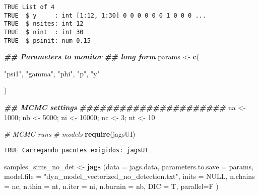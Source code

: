 \documentclass[
]{article}
\newenvironment{Shaded}{\begin{snugshade}}{\end{snugshade}}
\newcommand{\AttributeTok}[1]{\textcolor[rgb]{0.13,0.29,0.53}{#1}}
\newcommand{\CommentTok}[1]{\textcolor[rgb]{0.56,0.35,0.01}{\textit{#1}}}
\newcommand{\ConstantTok}[1]{\textcolor[rgb]{0.56,0.35,0.01}{#1}}
\newcommand{\DecValTok}[1]{\textcolor[rgb]{0.00,0.00,0.81}{#1}}
\newcommand{\DocumentationTok}[1]{\textcolor[rgb]{0.56,0.35,0.01}{\textbf{\textit{#1}}}}
\newcommand{\FunctionTok}[1]{\textcolor[rgb]{0.13,0.29,0.53}{\textbf{#1}}}
\newcommand{\NormalTok}[1]{#1}
\newcommand{\OtherTok}[1]{\textcolor[rgb]{0.56,0.35,0.01}{#1}}
\newcommand{\StringTok}[1]{\textcolor[rgb]{0.31,0.60,0.02}{#1}}
\begin{document}
\begin{verbatim}
TRUE List of 4
TRUE  $ y     : int [1:12, 1:30] 0 0 0 0 0 0 1 0 0 0 ...
TRUE  $ nsites: int 12
TRUE  $ nint  : int 30
TRUE  $ psinit: num 0.15
\end{verbatim}

\begin{Shaded}
\begin{Highlighting}[]
\DocumentationTok{\#\# Parameters to monitor}
\DocumentationTok{\#\# long form}
\NormalTok{params }\OtherTok{\textless{}{-}} \FunctionTok{c}\NormalTok{(}
  
  \StringTok{"psi1"}\NormalTok{,}
  \StringTok{"gamma"}\NormalTok{, }
  \StringTok{"phi"}\NormalTok{,}
  \StringTok{"p"}\NormalTok{,}
  \StringTok{"y"}
  
\NormalTok{)}

\DocumentationTok{\#\# MCMC settings}
\DocumentationTok{\#\#\#\#\#\#\#\#\#\#\#\#\#\#\#\#\#\#\#\#\#\#}
\NormalTok{na }\OtherTok{\textless{}{-}} \DecValTok{1000}\NormalTok{; nb }\OtherTok{\textless{}{-}} \DecValTok{5000}\NormalTok{; ni }\OtherTok{\textless{}{-}} \DecValTok{10000}\NormalTok{; nc }\OtherTok{\textless{}{-}} \DecValTok{3}\NormalTok{; nt }\OtherTok{\textless{}{-}} \DecValTok{10}

\CommentTok{\# MCMC runs}
\CommentTok{\# models}
\FunctionTok{require}\NormalTok{(jagsUI)}
\end{Highlighting}
\end{Shaded}

\begin{verbatim}
TRUE Carregando pacotes exigidos: jagsUI
\end{verbatim}

\begin{Shaded}
\begin{Highlighting}[]
\NormalTok{samples\_sims\_no\_det }\OtherTok{\textless{}{-}} \FunctionTok{jags}\NormalTok{ (}\AttributeTok{data =}\NormalTok{ jags.data, }
                             \AttributeTok{parameters.to.save =}\NormalTok{ params, }
                             \AttributeTok{model.file =} \StringTok{"dyn\_model\_vectorized\_no\_detection.txt"}\NormalTok{, }
                             \AttributeTok{inits =} \ConstantTok{NULL}\NormalTok{, }
                             \AttributeTok{n.chains =}\NormalTok{ nc, }
                             \AttributeTok{n.thin =}\NormalTok{ nt, }
                             \AttributeTok{n.iter =}\NormalTok{ ni, }
                             \AttributeTok{n.burnin =}\NormalTok{ nb, }
                             \AttributeTok{DIC =}\NormalTok{ T,  }
                             \AttributeTok{parallel=}\NormalTok{F}
\NormalTok{)}
\end{Highlighting}
\end{Shaded}
\end{document}
